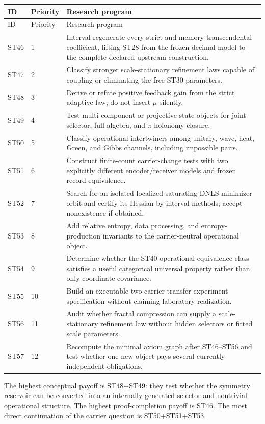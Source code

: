 \documentclass[11pt,a4paper]{article}
\begin{document}
\begin{longtable}{@{}p{}p{}p{}@{}}
\toprule
ID & Priority & Research program\\
\midrule
\endfirsthead
\toprule
ID & Priority & Research program\\
\midrule
\endhead
ST46 & 1 & Interval-regenerate every strict and memory transcendental coefficient, lifting ST28 from the frozen-decimal model to the complete declared upstream construction.\\
ST47 & 2 & Classify stronger scale-stationary refinement laws capable of coupling or eliminating the free ST30 parameters.\\
ST48 & 3 & Derive or refute positive feedback gain from the strict adaptive law; do not insert $\mu$ silently.\\
ST49 & 4 & Test multi-component or projective state objects for joint selector, full algebra, and $\pi$-holonomy closure.\\
ST50 & 5 & Classify operational intertwiners among unitary, wave, heat, Green, and Gibbs channels, including impossible pairs.\\
ST51 & 6 & Construct finite-count carrier-change tests with two explicitly different encoder/receiver models and frozen record equivalence.\\
ST52 & 7 & Search for an isolated localized saturating-DNLS minimizer orbit and certify its Hessian by interval methods; accept nonexistence if obtained.\\
ST53 & 8 & Add relative entropy, data processing, and entropy-production invariants to the carrier-neutral operational object.\\
ST54 & 9 & Determine whether the ST40 operational equivalence class satisfies a useful categorical universal property rather than only coordinate covariance.\\
ST55 & 10 & Build an executable two-carrier transfer experiment specification without claiming laboratory realization.\\
ST56 & 11 & Audit whether fractal compression can supply a scale-stationary refinement law without hidden selectors or fitted scale parameters.\\
ST57 & 12 & Recompute the minimal axiom graph after ST46--ST56 and test whether one new object pays several currently independent obligations.\\
\bottomrule
\end{longtable}

The highest conceptual payoff is ST48+ST49: they test whether the symmetry reservoir can be converted into an internally generated selector and nontrivial operational structure. The highest proof-completion payoff is ST46. The most direct continuation of the carrier question is ST50+ST51+ST53.
\end{document}
